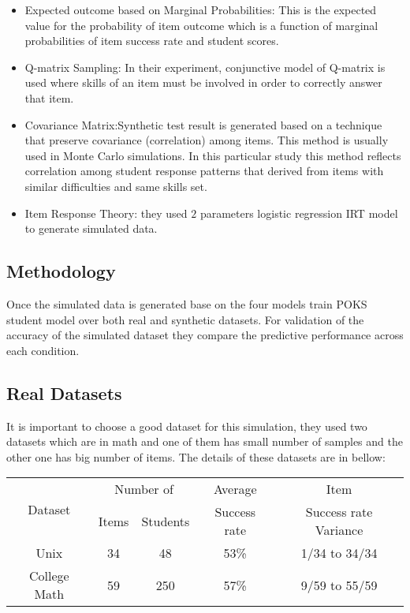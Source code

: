 \begin{itemize}
\item Expected outcome based on Marginal Probabilities: This is the expected value for the probability of item outcome which is a function of marginal probabilities of item success rate and student scores.
\item Q-matrix Sampling: In their experiment, conjunctive model of Q-matrix is used where skills of an item must be involved in order to correctly answer that item.
\item Covariance Matrix:Synthetic test result is generated based on a technique that preserve covariance (correlation) among items. This method is usually used in Monte Carlo simulations. In this particular study this method reflects correlation among student response patterns that derived from items with similar difficulties and same skills set.
\item Item Response Theory: they used $2$ parameters logistic regression IRT model to generate simulated data.

\end{itemize}

\subsection{Methodology}
Once the simulated data is generated base on the four models \citet{Desmarais2010} train POKS student model over both real and synthetic datasets. For validation of the accuracy of the simulated dataset they compare the predictive performance across each condition. 

\subsection{Real Datasets}
It is important to choose a good dataset for this simulation, they used two datasets which are in math and one of them has small number of samples and the other one has big number of items. The details of these datasets are in bellow:

\begin{center}

\begin{tabular}{|c|c|c|c|c|}
\hline 
\multirow{2}{*}{Dataset} & \multicolumn{2}{c|}{Number of} & Average & Item\tabularnewline
\cline{2-3} 
 & Items & Students & Success rate & Success rate Variance\tabularnewline
\hline 
Unix & 34 & 48 & 53\% & 1/34 to 34/34\tabularnewline
\hline 
College Math & 59 & 250 & 57\% & 9/59 to 55/59\tabularnewline
\hline 
\end{tabular}

\end{center}

